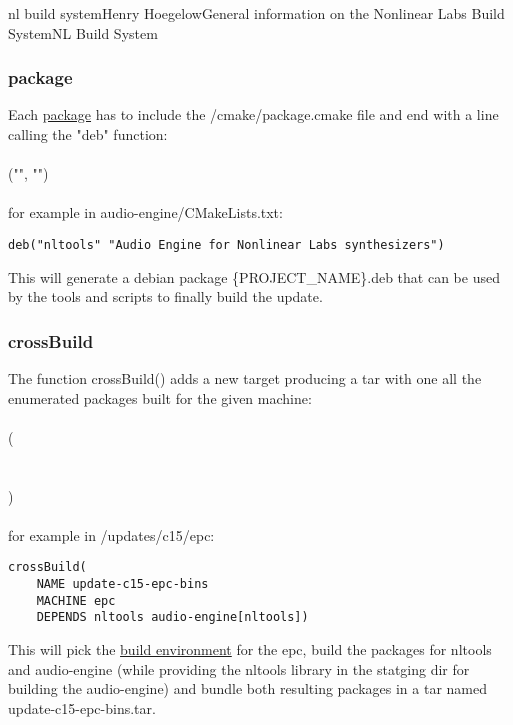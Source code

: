 \documentclass[11pt]{article}
\begin{document}
\begin{Name}{1}{nl build system}{Henry Hoegelow}{General information on the Nonlinear Labs Build System}{NL Build System}
\subsubsection{package} \label{cmake-package}
Each \hyperref[packages]{package} has to include the /cmake/package.cmake file and end with a line calling the "deb" function:\\
\\
("", "")\\
\\
for example in audio-engine/CMakeLists.txt:
\begin{verbatim}
deb("nltools" "Audio Engine for Nonlinear Labs synthesizers")
\end{verbatim}
This will generate a debian package \{PROJECT\_NAME\}.deb that can be used by the tools and scripts to finally build the update.

\subsubsection{crossBuild} \label{crossbuild}
The function crossBuild() adds a new target producing a tar with one all the enumerated packages built for the given machine:\\
\\
(\\
\indent{}\\
\indent{}\\
\indent{})\\
\\
for example in /updates/c15/epc:
\begin{verbatim}
crossBuild(
    NAME update-c15-epc-bins 
    MACHINE epc
    DEPENDS nltools audio-engine[nltools])
\end{verbatim}
This will pick the \hyperref[buildenv]{build environment} for the epc, build the packages for nltools and audio-engine (while providing the nltools library in the statging dir for building the audio-engine) and bundle both resulting packages in a tar named update-c15-epc-bins.tar.


\end{Name}
\end{document}
